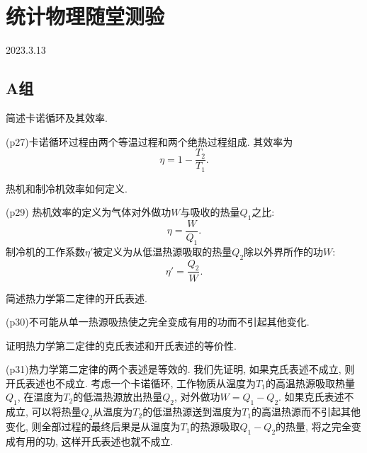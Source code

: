 \section{统计物理随堂测验}
2023.3.13
\subsection{A组}
\begin{questions}
  \question 简述卡诺循环及其效率.
  \begin{solution}
    (p27)卡诺循环过程由两个等温过程和两个绝热过程组成. 其效率为
    \begin{equation}
      \eta = 1 - \frac{T_2}{T_1}.
    \end{equation}
  \end{solution}
  \question 热机和制冷机效率如何定义.
  \begin{solution}
    (p29)
    热机效率的定义为气体对外做功$W$与吸收的热量$Q_1$之比:
    \begin{equation}
      \eta = \frac{W}{Q_1}.
    \end{equation}
    制冷机的工作系数$\eta'$被定义为从低温热源吸取的热量$Q_2$除以外界所作的功$W$:
    \begin{equation}
      \eta' = \frac{Q_2}{W}.
    \end{equation}
  \end{solution}
  \question 简述热力学第二定律的开氏表述.
  \begin{solution}
    (p30)不可能从单一热源吸热使之完全变成有用的功而不引起其他变化.
  \end{solution}
  \question 证明热力学第二定律的克氏表述和开氏表述的等价性.
  \begin{solution}
    (p31)热力学第二定律的两个表述是等效的. 我们先证明, 如果克氏表述不成立, 则开氏表述也不成立. 考虑一个卡诺循环, 工作物质从温度为$T_1$的高温热源吸取热量$Q_1$, 在温度为$T_2$的低温热源放出热量$Q_2$, 对外做功$W=Q_1-Q_2$. 如果克氏表述不成立, 可以将热量$Q_2$从温度为$T_2$的低温热源送到温度为$T_1$的高温热源而不引起其他变化, 则全部过程的最终后果是从温度为$T_1$的热源吸取$Q_1-Q_2$的热量, 将之完全变成有用的功, 这样开氏表述也就不成立.


\end{solution}
\end{questions}

